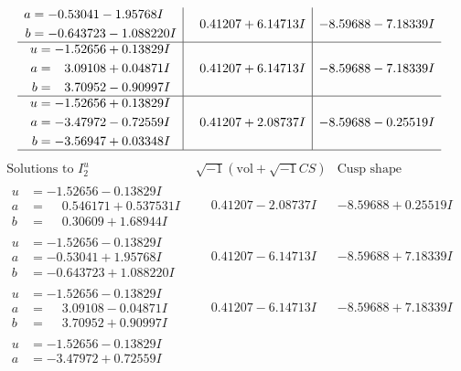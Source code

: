 \documentclass[1p]{elsarticle_modified}
\theoremstyle{definition}
\newcommand{\I}{\sqrt{-1}}
\begin{document}
$$\begin{array}{c|c|c}
\begin{aligned}
a &= -0.53041 - 1.95768 I \\
b &= -0.643723 - 1.088220 I\end{aligned}
 & \phantom{-}0.41207 + 6.14713 I & -8.59688 - 7.18339 I \\ \hline\begin{aligned}
u &= -1.52656 + 0.13829 I \\
a &= \phantom{-}3.09108 + 0.04871 I \\
b &= \phantom{-}3.70952 - 0.90997 I\end{aligned}
 & \phantom{-}0.41207 + 6.14713 I & -8.59688 - 7.18339 I \\ \hline\begin{aligned}
u &= -1.52656 + 0.13829 I \\
a &= -3.47972 - 0.72559 I \\
b &= -3.56947 + 0.03348 I\end{aligned}
 & \phantom{-}0.41207 + 2.08737 I & -8.59688 - 0.25519 I\\
 \hline 
 \end{array}$$\newpage$$\begin{array}{c|c|c}  
\text{Solutions to }I^u_{2}& \I (\text{vol} + \sqrt{-1}CS) & \text{Cusp shape}\\
 \hline 
\begin{aligned}
u &= -1.52656 - 0.13829 I \\
a &= \phantom{-}0.546171 + 0.537531 I \\
b &= \phantom{-}0.30609 + 1.68944 I\end{aligned}
 & \phantom{-}0.41207 - 2.08737 I & -8.59688 + 0.25519 I \\ \hline\begin{aligned}
u &= -1.52656 - 0.13829 I \\
a &= -0.53041 + 1.95768 I \\
b &= -0.643723 + 1.088220 I\end{aligned}
 & \phantom{-}0.41207 - 6.14713 I & -8.59688 + 7.18339 I \\ \hline\begin{aligned}
u &= -1.52656 - 0.13829 I \\
a &= \phantom{-}3.09108 - 0.04871 I \\
b &= \phantom{-}3.70952 + 0.90997 I\end{aligned}
 & \phantom{-}0.41207 - 6.14713 I & -8.59688 + 7.18339 I \\ \hline\begin{aligned}
u &= -1.52656 - 0.13829 I \\
a &= -3.47972 + 0.72559 I \\

\end{aligned}
\end{array}$$
\end{document}
